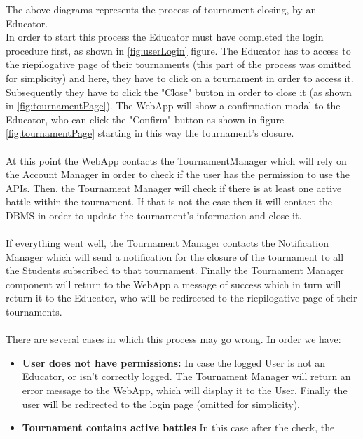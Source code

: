 \documentclass{article}
\begin{document}
{        The above diagrams represents the process of tournament closing, by an Educator. \\
        In order to start this process the Educator must have completed the login procedure
        first, as shown in \ref{fig:userLogin} figure.
        The Educator has to access to the riepilogative page of their tournaments 
        (this part of the process was omitted for simplicity) and here, they have to click 
        on a tournament in order to access it. Subsequently they have to click the "Close" button
        in order to close it (as shown in \ref{fig:tournamentPage}).
        The WebApp will show a confirmation modal to the Educator, who can click the "Confirm"
        button as shown in figure \ref{fig:tournamentPage} starting in this way the 
        tournament's closure. 
        \\ \\
        At this point the WebApp contacts the TournamentManager which will rely on the Account
        Manager in order to check if the user has the permission to use the APIs.
        Then, the Tournament Manager will check if there is at least one active battle within the
        tournament. If that is not the case then it will contact the DBMS in order to update the
        tournament's information and close it.
        \\ \\
        If everything went well, the Tournament Manager contacts the Notification
        Manager which will send a notification for the closure of the tournament to all the 
        Students subscribed to that tournament. 
        Finally the Tournament Manager component will return to the WebApp a message of success
        which in turn will return it to the Educator, who will be redirected to the 
        riepilogative page of their tournaments.
        \\ \\
        There are several cases in which this process may go wrong. In order we have:
        \begin{itemize}
            \item \textbf{User does not have permissions:} In case the logged User is not an
            Educator, or isn't correctly logged. The Tournament Manager will return an
            error message to the WebApp, which will display it to the User.
            Finally the user will be redirected to the login page (omitted for simplicity).
            \item \textbf{Tournament contains active battles} In this case after the check, the 

\end{itemize}}
\end{document}
